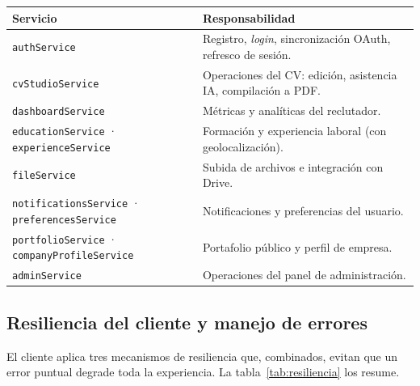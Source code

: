 \vspace{0.2cm}
\noindent
\renewcommand{\arraystretch}{1.3}
\fontsize{8.5}{10.2}\selectfont\sffamily
\begin{tabularx}{\textwidth}{|L{4.4cm}|Y|}
\hline
{}
\sffamily\textbf{Servicio} & \sffamily\textbf{Responsabilidad} \\
\hline
\texttt{authService} & Registro, \textit{login}, sincronización OAuth, refresco de sesión. \\
\hline
{}
\texttt{cvStudioService} & Operaciones del CV: edición, asistencia IA, compilación a PDF. \\
\hline
\texttt{dashboardService} & Métricas y analíticas del reclutador. \\
\hline
{}
\texttt{educationService} · \texttt{experienceService} & Formación y experiencia laboral (con geolocalización). \\
\hline
\texttt{fileService} & Subida de archivos e integración con Drive. \\
\hline
{}
\texttt{notificationsService} · \texttt{preferencesService} & Notificaciones y preferencias del usuario. \\
\hline
\texttt{portfolioService} · \texttt{companyProfileService} & Portafolio público y perfil de empresa. \\
\hline
{}
\texttt{adminService} & Operaciones del panel de administración. \\
\hline
\end{tabularx}
\label{tab:servicios-fe}

\clearpage
\subsection{Resiliencia del cliente y manejo de errores}
\label{subsec:resiliencia}

El cliente aplica tres mecanismos de resiliencia que, combinados, evitan que un error
puntual degrade toda la experiencia. La tabla~\ref{tab:resiliencia} los resume.

